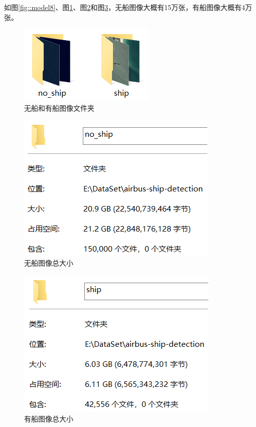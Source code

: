 如图\ref{fig::model8}、图\ref{fig::model9}、图\ref{fig::model10}和图\ref{fig::model11}，无船图像大概有15万张，有船图像大概有4万张。

\begin{figure}[htbp]
\centering
\includegraphics[width=0.6\linewidth]{body/model_pic/noship_ship_dir}
\caption{无船和有船图像文件夹}
\label{fig::model9}
\end{figure}

\begin{figure}[htbp]
\centering
\includegraphics[width=0.6\linewidth]{body/model_pic/no_ship}
\caption{无船图像总大小}
\label{fig::model10}
\end{figure}

\begin{figure}[htbp]
\centering
\includegraphics[width=0.6\linewidth]{body/model_pic/ship}
\caption{有船图像总大小}
\label{fig::model11}
\end{figure}

